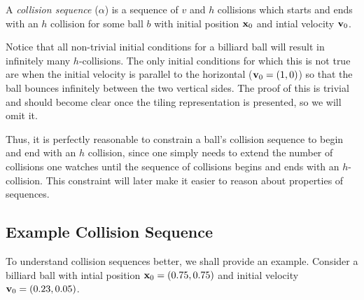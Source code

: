 \begin{definition}
  A \emph{collision sequence} ($\alpha$) is a sequence of $v$ and $h$ collisions which starts and ends with an $h$ collision for some ball $b$ with initial position $\mathbf{x}_0$ and intial velocity $\mathbf{v}_0$.
\end{definition}

Notice that all non-trivial initial conditions for a billiard ball will result in infinitely many $h$-collisions. The only initial conditions for which this is not true are when the initial velocity is parallel to the horizontal ($\mathbf{v}_0 = (1, 0)$) so that the ball bounces infinitely between the two vertical sides. The proof of this is trivial and should become clear once the tiling representation is presented, so we will omit it.

Thus, it is perfectly reasonable to constrain a ball's collision sequence to begin and end with an $h$ collision, since one simply needs to extend the number of collisions one watches until the sequence of collisions begins and ends with an $h$-collision. This constraint will later make it easier to reason about properties of sequences.

\subsection{Example Collision Sequence}

To understand collision sequences better, we shall provide an example. Consider a billiard ball with intial position $\mathbf{x}_0 = (0.75, 0.75)$ and initial velocity $\mathbf{v}_0 = (0.23, 0.05)$.

